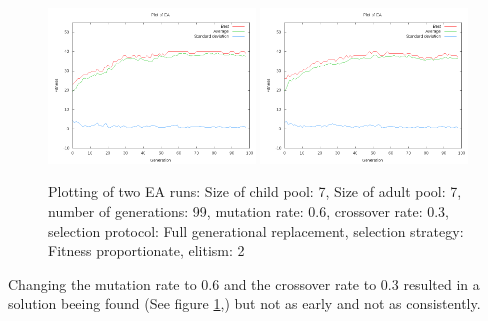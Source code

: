 \documentclass[11pt]{article}
\begin{document}
\begin{figure}[ht]
\begin{center}
\mbox{\includegraphics[width=0.49\textwidth]{images/31.png}}
\mbox{\includegraphics[width=0.49\textwidth]{images/32.png}}
\end{center}
\caption{Plotting of two EA runs:
Size of child pool: 7,
Size of adult pool: 7,
number of generations: 99,
mutation rate: 0.6,
crossover rate: 0.3,
selection protocol: Full generational replacement,
selection strategy: Fitness proportionate,
elitism: 2}
\label{fig:3}
\end{figure}

Changing the mutation rate to 0.6 and the crossover rate to 0.3 resulted in a solution
beeing found (See figure \ref{fig:3},) but not as early and not as consistently.
\end{document}
